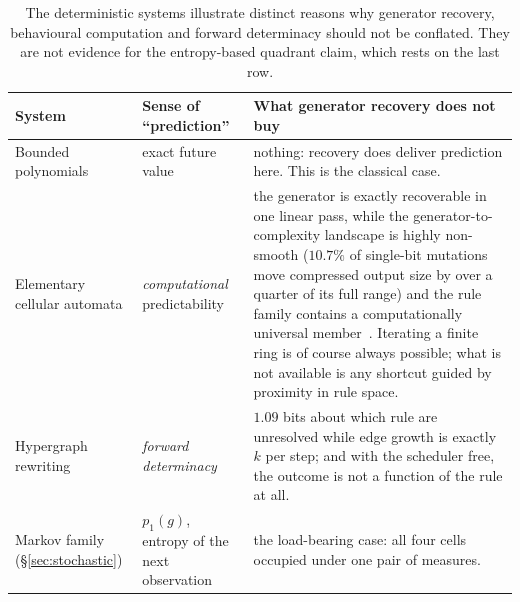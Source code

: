 \documentclass[11pt]{article}
\begin{document}
\begin{table}[h]
\centering
\begin{tabular}{p{2.9cm}p{3.0cm}p{7.6cm}}
\toprule
System & Sense of ``prediction'' & What generator recovery does not buy \\
\midrule
Bounded polynomials & exact future value & nothing: recovery does deliver prediction here.
This is the classical case. \\
\addlinespace
Elementary cellular automata & \emph{computational} predictability & the generator is
exactly recoverable in one linear pass, while the generator-to-complexity landscape is
highly non-smooth ($10.7\%$ of single-bit mutations move compressed output size by over a
quarter of its full range) and the rule family contains a computationally universal
member~\cite{cook2004}. Iterating a finite ring is of course always possible; what is not
available is any shortcut guided by proximity in rule space. \\
\addlinespace
Hypergraph rewriting & \emph{forward determinacy} & $1.09$ bits about which rule are
unresolved while edge growth is exactly $k$ per step; and with the scheduler free, the
outcome is not a function of the rule at all. \\
\addlinespace
Markov family (\S\ref{sec:stochastic}) & $p_1(g)$, entropy of the next observation &
the load-bearing case: all four cells occupied under one pair of measures. \\
\bottomrule
\end{tabular}
\caption{The deterministic systems illustrate distinct reasons why generator recovery,
behavioural computation and forward determinacy should not be conflated. They are not
evidence for the entropy-based quadrant claim, which rests on the last row.}
\end{table}
\end{document}
